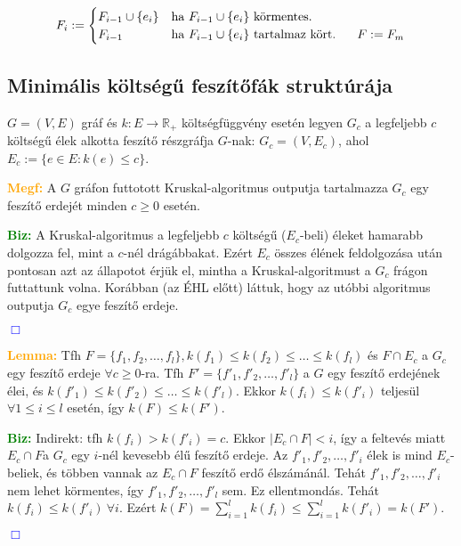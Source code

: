 \documentclass[12pt]{article}
\begin{document}
				\begin{equation*}
					F_i :=\begin{cases}
						F_{i-1}\cup \{e_i\} & \text{ha $F_{i-1}\cup \{e_i\}$ körmentes.} \\
						F_{i-1} & \text{ha $F_{i-1}\cup \{e_i\}$ tartalmaz kört. \;\;\; $F:=F_m$}
					\end{cases}
				\end{equation*}

		\subsection{Minimális költségű feszítőfák struktúrája}

			$G=(V,E)$ gráf és $k:E \rightarrow \mathbb{R}_+$ költségfüggvény esetén legyen $G_c$ a legfeljebb $c$ költségű élek alkotta feszítő részgráfja $G$-nak: $G_c = (V,E_c)$, ahol $E_c := \{e \in E : k(e)\leq c\}$.

			\textcolor{orange}{\textbf{Megf:}} A $G$ gráfon futtotott Kruskal-algoritmus outputja tartalmazza $G_c$ egy feszítő erdejét minden $c \geq 0$ esetén.

			\textcolor{green}{\textbf{Biz:}} A Kruskal-algoritmus a legfeljebb $c$ költségű ($E_c$-beli) éleket hamarabb dolgozza fel, mint a $c$-nél drágábbakat. Ezért $E_c$ összes élének feldolgozása után pontosan azt az állapotot érjük el, mintha a Kruskal-algoritmust a $G_c$ frágon futtattunk volna. Korábban (az ÉHL előtt) láttuk, hogy az utóbbi algoritmus outputja $G_c$ egye feszítő erdeje. \raggedright \textcolor{blue}{$\Box$} 

			\textcolor{orange}{\textbf{Lemma:}} Tfh $F=\{f_1,f_2,\dots,f_l\}, k(f_1) \leq k(f_2) \leq \dots \leq k(f_l)$ és $F\cap E_c$ a $G_c$ egy feszítő erdeje $\forall c \geq 0$-ra. Tfh $F' = \{f'_1, f'_2,\dots,f'_l\}$ a $G$ egy feszítő erdejének élei, és $k(f'_1) \leq k(f'_2) \leq \dots \leq k(f'_l)$. Ekkor $k(f_i) \leq k(f'_i)$ teljesül $\forall 1 \leq i \leq l$ esetén, így $k(F) \leq k(F')$.
			
			\textcolor{green}{\textbf{Biz:}} Indirekt: tfh $k(f_i) > k(f'_i) = c$. Ekkor $|E_c \cap F| <i$, így a feltevés miatt $E_c \cap F$a $G_c$ egy $i$-nél kevesebb élű feszítő erdeje. Az $f'_1, f'_2, \dots, f'_i$ élek is mind $E_c$-beliek, és többen vannak az $E_c\cap F$ feszítő erdő élszámánál. Tehát $f'_1, f'_2, \dots, f'_i$ nem lehet körmentes, így $f'_1, f'_2, \dots, f'_l$ sem. Ez ellentmondás. Tehát $k(f_i) \leq k(f'_i) \:\forall i$. Ezért $k(F) = \sum_{i=1}^{l}k(f_i) \leq \sum_{i=1}^{l}k(f'_i)=k(F')$. \raggedright \textcolor{blue}{$\Box$} 
\end{document}
